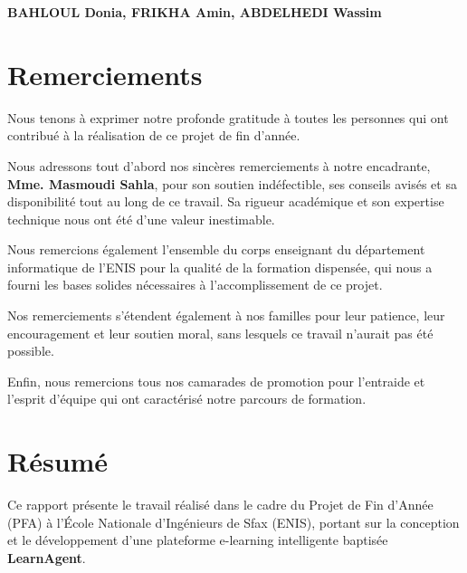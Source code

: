 \documentclass[12pt,a4paper]{report}
\begin{document}
\vspace{2cm}
\begin{flushright}
\textbf{BAHLOUL Donia, FRIKHA Amin, ABDELHEDI Wassim}
\end{flushright}

\newpage

\chapter*{Remerciements}

Nous tenons à exprimer notre profonde gratitude à toutes les personnes qui ont contribué à la réalisation de ce projet de fin d'année.

Nous adressons tout d'abord nos sincères remerciements à notre encadrante, \textbf{Mme. Masmoudi Sahla}, pour son soutien indéfectible, ses conseils avisés et sa disponibilité tout au long de ce travail. Sa rigueur académique et son expertise technique nous ont été d'une valeur inestimable.

Nous remercions également l'ensemble du corps enseignant du département informatique de l'ENIS pour la qualité de la formation dispensée, qui nous a fourni les bases solides nécessaires à l'accomplissement de ce projet.

Nos remerciements s'étendent également à nos familles pour leur patience, leur encouragement et leur soutien moral, sans lesquels ce travail n'aurait pas été possible.

Enfin, nous remercions tous nos camarades de promotion pour l'entraide et l'esprit d'équipe qui ont caractérisé notre parcours de formation.

\newpage

\chapter*{Résumé}

Ce rapport présente le travail réalisé dans le cadre du Projet de Fin d'Année (PFA) à l'École Nationale d'Ingénieurs de Sfax (ENIS), portant sur la conception et le développement d'une plateforme e-learning intelligente baptisée \textbf{LearnAgent}.
\end{document}

